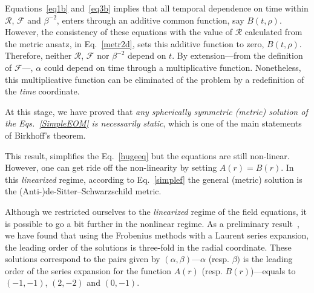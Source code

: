 Equations~\eqref{eq1b} and~\eqref{eq3b} implies that all temporal dependence on time within $\mathcal{R}$, $\mathcal{F}$ and $\beta^{-2}$, enters through an additive common function, say $B(t,\rho)$. However, the consistency of these equations with the value of $\mathcal{R}$ calculated from the metric ansatz, in Eq.~\eqref{metr2d}, sets this additive function to zero, $B(t,\rho)$. Therefore, neither $\mathcal{R}$, $\mathcal{F}$ nor $\beta^{-2}$ depend on $t$. By extension---from the definition of $\mathcal{F}$---, $\alpha$ could depend on time through a multiplicative function. Nonetheless, this multiplicative function can be eliminated of the problem by a redefinition of the \emph{time} coordinate.

At this stage, we have proved that \emph{any spherically symmetric (metric) solution of the Eqs.~\eqref{SimpleEOM} is necessarily static}, which is one of the main statements of Birkhoff's theorem.

This result, simplifies the Eq.~\eqref{hugeeq} but the equations are still non-linear. However, one can get ride off the non-linearity by setting $A(r) = B(r)$. In this \emph{linearized} regime, according to Eq.~\eqref{simplef} the general (metric) solution is the (Anti-)de-Sitter--Schwarzschild metric.

Although we restricted ourselves to the \emph{linearized} regime of the field equations, it is possible to go a bit further in the nonlinear regime. As a preliminary result~\cite{OCF-future2}, we have found that using the Frobenius methods with a Laurent series expansion, the leading order of the solutions is three-fold in the radial coordinate. These solutions correspond to the pairs given by $(\alpha,\beta)$---$\alpha$ (resp. $\beta)$ is the leading order of the series expansion for the function $A(r)$ (resp. $B(r)$)---equals to $(-1,-1)$, $(2,-2)$ and $(0,-1)$.



